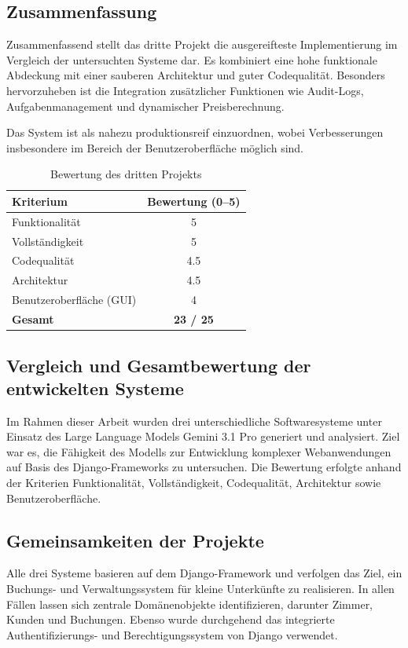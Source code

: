 \subsection{Zusammenfassung}

Zusammenfassend stellt das dritte Projekt die ausgereifteste Implementierung im Vergleich der untersuchten Systeme dar. Es kombiniert eine hohe funktionale Abdeckung mit einer sauberen Architektur und guter Codequalität. Besonders hervorzuheben ist die Integration zusätzlicher Funktionen wie Audit-Logs, Aufgabenmanagement und dynamischer Preisberechnung.

Das System ist als nahezu produktionsreif einzuordnen, wobei Verbesserungen insbesondere im Bereich der Benutzeroberfläche möglich sind.

\begin{table}[h]
\centering
\caption{Bewertung des dritten Projekts}
\begin{tabular}{l c}
\hline
\textbf{Kriterium} & \textbf{Bewertung (0--5)} \\
\hline
Funktionalität & 5 \\
Vollständigkeit & 5 \\
Codequalität & 4.5 \\
Architektur & 4.5 \\
Benutzeroberfläche (GUI) & 4 \\
\hline
\textbf{Gesamt} & \textbf{23 / 25} \\
\hline
\end{tabular}
\end{table}

\subsection{Vergleich und Gesamtbewertung der entwickelten Systeme}

Im Rahmen dieser Arbeit wurden drei unterschiedliche Softwaresysteme unter Einsatz des Large Language Models Gemini 3.1 Pro generiert und analysiert. Ziel war es, die Fähigkeit des Modells zur Entwicklung komplexer Webanwendungen auf Basis des Django-Frameworks zu untersuchen. Die Bewertung erfolgte anhand der Kriterien Funktionalität, Vollständigkeit, Codequalität, Architektur sowie Benutzeroberfläche.

\subsection{Gemeinsamkeiten der Projekte}

Alle drei Systeme basieren auf dem Django-Framework und verfolgen das Ziel, ein Buchungs- und Verwaltungssystem für kleine Unterkünfte zu realisieren. In allen Fällen lassen sich zentrale Domänenobjekte identifizieren, darunter Zimmer, Kunden und Buchungen. Ebenso wurde durchgehend das integrierte Authentifizierungs- und Berechtigungssystem von Django verwendet.

